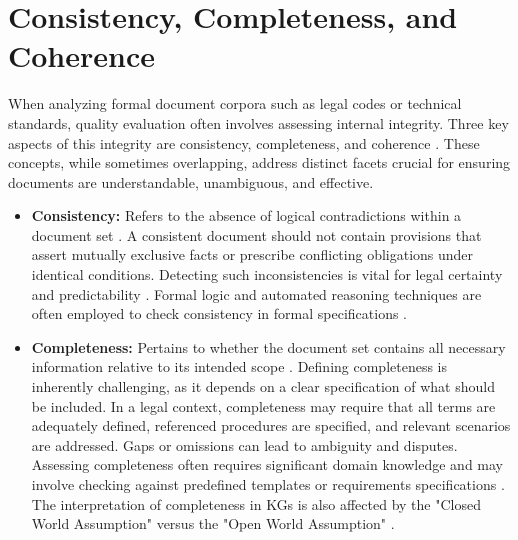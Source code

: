 \section{Consistency, Completeness, and Coherence}
When analyzing formal document corpora such as legal codes or technical standards, quality evaluation often involves assessing internal integrity. Three key aspects of this integrity are consistency, completeness, and coherence \parencite{RefWorks:RefID:29-umar2024advances}. These concepts, while sometimes overlapping, address distinct facets crucial for ensuring documents are understandable, unambiguous, and effective.

\begin{itemize}
    \item \textbf{Consistency:} Refers to the absence of logical contradictions within a document set \parencite{RefWorks:RefID:10-zowghi2003interplay, RefWorks:RefID:21-heitmeyer1996automated, RefWorks:RefID:25-nentwich2005managing, RefWorks:RefID:26-egyed2006instant, RefWorks:RefID:27-tröls2022instant, RefWorks:RefID:28-yang2024fizz, RefWorks:RefID:30-guo2023joint}. A consistent document should not contain provisions that assert mutually exclusive facts or prescribe conflicting obligations under identical conditions. Detecting such inconsistencies is vital for legal certainty and predictability \parencite{RefWorks:RefID:52-donelson2019legal, RefWorks:RefID:53-duck-mayr2022explaining, RefWorks:RefID:54-rossi2016inconsistent}. Formal logic and automated reasoning techniques are often employed to check consistency in formal specifications \parencite{RefWorks:RefID:21-heitmeyer1996automated, RefWorks:RefID:24-brucker2019ontologies}.

    \item \textbf{Completeness:} Pertains to whether the document set contains all necessary information relative to its intended scope \parencite{RefWorks:RefID:10-zowghi2003interplay}. Defining completeness is inherently challenging, as it depends on a clear specification of what should be included. In a legal context, completeness may require that all terms are adequately defined, referenced procedures are specified, and relevant scenarios are addressed. Gaps or omissions can lead to ambiguity and disputes. Assessing completeness often requires significant domain knowledge and may involve checking against predefined templates or requirements specifications \parencite{RefWorks:RefID:10-zowghi2003interplay, RefWorks:RefID:29-umar2024advances}. The interpretation of completeness in KGs is also affected by the "Closed World Assumption" versus the "Open World Assumption" \parencite{RefWorks:RefID:148-reiter1978on, RefWorks:RefID:149-hitzler2009foundations}.


\end{itemize}
